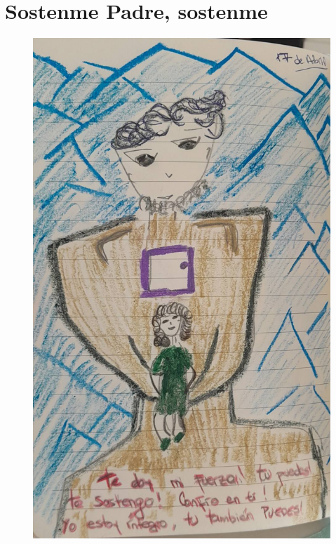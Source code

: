 \documentclass[12pt, a4paper, twoside]{book} %
\begin{document}
\chapter{Sostenme Padre, sostenme}

\begin{figure}[H]
	\centering
	\includegraphics[width=\textwidth]{./images/1f81324dd896f4.jpg}
\end{figure}
\end{document}
